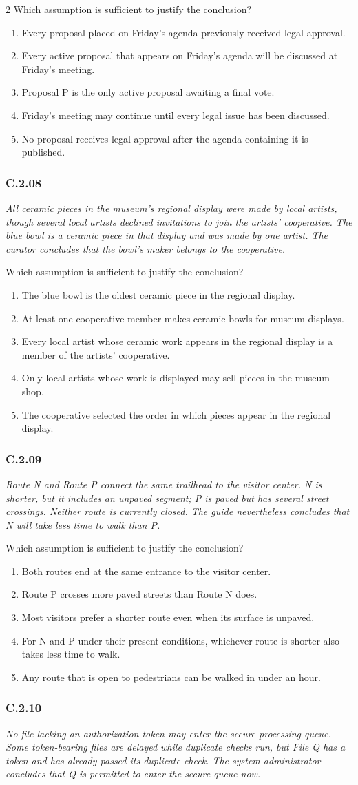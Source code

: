\documentclass[10pt]{extarticle}
\newcommand{\choice}[1]{\item #1}
\newcommand{\bankitem}[1]{\subsubsection*{#1}}
\begin{document}
\begin{multicols}{2}
Which assumption is sufficient to justify the conclusion?
\begin{enumerate}[label=(\alph*)]
  \choice{Every proposal placed on Friday's agenda previously received legal approval.}
  \choice{Every active proposal that appears on Friday's agenda will be discussed at Friday's meeting.}
  \choice{Proposal P is the only active proposal awaiting a final vote.}
  \choice{Friday's meeting may continue until every legal issue has been discussed.}
  \choice{No proposal receives legal approval after the agenda containing it is published.}
\end{enumerate}
\bankitem{C.2.08}
\emph{All ceramic pieces in the museum's regional display were made by local artists, though several local artists declined invitations to join the artists' cooperative. The blue bowl is a ceramic piece in that display and was made by one artist. The curator concludes that the bowl's maker belongs to the cooperative.}

Which assumption is sufficient to justify the conclusion?
\begin{enumerate}[label=(\alph*)]
  \choice{The blue bowl is the oldest ceramic piece in the regional display.}
  \choice{At least one cooperative member makes ceramic bowls for museum displays.}
  \choice{Every local artist whose ceramic work appears in the regional display is a member of the artists' cooperative.}
  \choice{Only local artists whose work is displayed may sell pieces in the museum shop.}
  \choice{The cooperative selected the order in which pieces appear in the regional display.}
\end{enumerate}
\bankitem{C.2.09}
\emph{Route N and Route P connect the same trailhead to the visitor center. N is shorter, but it includes an unpaved segment; P is paved but has several street crossings. Neither route is currently closed. The guide nevertheless concludes that N will take less time to walk than P.}

Which assumption is sufficient to justify the conclusion?
\begin{enumerate}[label=(\alph*)]
  \choice{Both routes end at the same entrance to the visitor center.}
  \choice{Route P crosses more paved streets than Route N does.}
  \choice{Most visitors prefer a shorter route even when its surface is unpaved.}
  \choice{For N and P under their present conditions, whichever route is shorter also takes less time to walk.}
  \choice{Any route that is open to pedestrians can be walked in under an hour.}
\end{enumerate}
\bankitem{C.2.10}
\emph{No file lacking an authorization token may enter the secure processing queue. Some token-bearing files are delayed while duplicate checks run, but File Q has a token and has already passed its duplicate check. The system administrator concludes that Q is permitted to enter the secure queue now.}


\end{multicols}
\end{document}
